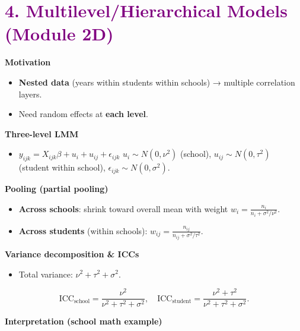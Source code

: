 \documentclass[
  letterpaper,
  DIV=11,
  numbers=noendperiod]{scrreprt}
\providecommand{\tightlist}{%
  \setlength{\itemsep}{0pt}\setlength{\parskip}{0pt}}\usepackage{longtable,booktabs,array}
\begin{document}
\hypertarget{section-15}{%
\section*{\texorpdfstring{\textcolor{purple}{4. Multilevel/Hierarchical Models (Module 2D)}}{}}\label{section-15}}

\markright{\textcolor{purple}{4. Multilevel/Hierarchical Models (Module 2D)}}

\textbf{Motivation}

\begin{itemize}
\tightlist
\item
  \textbf{Nested data} (years within students within schools) → multiple
  correlation layers.
\item
  Need random effects at \textbf{each level}.
\end{itemize}

\textbf{Three-level LMM}

\begin{itemize}
\tightlist
\item
  \(y_{ijk} = X_{ijk}\beta + u_i + u_{ij} + \epsilon_{ijk}\)
  \(u_i\sim N(0,\nu^2)\) (school), \(u_{ij}\sim N(0,\tau^2)\) (student
  within school), \(\epsilon_{ijk}\sim N(0,\sigma^2)\).
\end{itemize}

\textbf{Pooling (partial pooling)}

\begin{itemize}
\tightlist
\item
  \textbf{Across schools}: shrink toward overall mean with weight
  \(w_i=\frac{n_i}{n_i+\sigma^2/\nu^2}\).
\item
  \textbf{Across students} (within schools):
  \(w_{ij}=\frac{n_{ij}}{n_{ij}+\sigma^2/\tau^2}\).
\end{itemize}

\textbf{Variance decomposition \& ICCs}

\begin{itemize}
\tightlist
\item
  Total variance: \(\nu^2+\tau^2+\sigma^2\).
\end{itemize}

\[
\text{ICC}_{\text{school}}=\frac{\nu^2}{\nu^2+\tau^2+\sigma^2},\quad
   \text{ICC}_{\text{student}}=\frac{\nu^2+\tau^2}{\nu^2+\tau^2+\sigma^2}.
\]

\textbf{Interpretation (school math example)}
\end{document}
